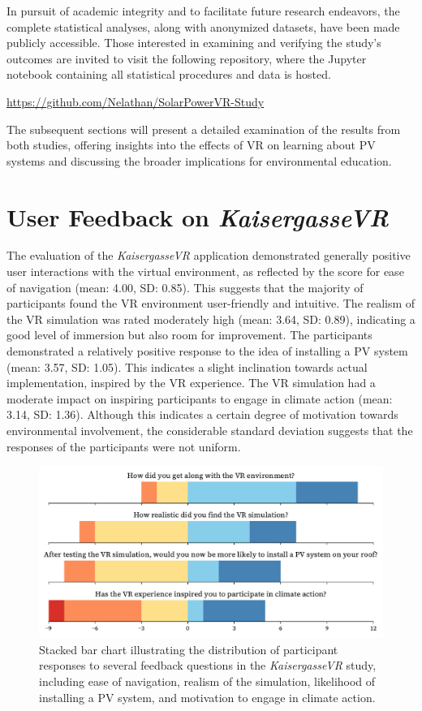 \documentclass[draft, final]{vutinfth} %
\begin{document}
In pursuit of academic integrity and to facilitate future research endeavors, the complete statistical analyses, along with anonymized datasets, have been made publicly accessible. Those interested in examining and verifying the study's outcomes are invited to visit the following repository, where the Jupyter notebook containing all statistical procedures and data is hosted.
\begin{center}
\url{https://github.com/Nelathan/SolarPowerVR-Study}
\end{center}

The subsequent sections will present a detailed examination of the results from both studies, offering insights into the effects of VR on learning about PV systems and discussing the broader implications for environmental education.

\section{User Feedback on \textit{KaisergasseVR}}
The evaluation of the \textit{KaisergasseVR} application demonstrated generally positive user interactions with the virtual environment, as reflected by the score for ease of navigation (mean: 4.00, SD: 0.85). This suggests that the majority of participants found the VR environment user-friendly and intuitive.
The realism of the VR simulation was rated moderately high (mean: 3.64, SD: 0.89), indicating a good level of immersion but also room for improvement.
The participants demonstrated a relatively positive response to the idea of installing a PV system (mean: 3.57, SD: 1.05). This indicates a slight inclination towards actual implementation, inspired by the VR experience.
The VR simulation had a moderate impact on inspiring participants to engage in climate action (mean: 3.14, SD: 1.36). Although this indicates a certain degree of motivation towards environmental involvement, the considerable standard deviation suggests that the responses of the participants were not uniform.

\begin{figure}[h]
    \centering
    \includegraphics[width=\textwidth]{graphics/feedback-kaisergasse.pdf}
    \caption{Stacked bar chart illustrating the distribution of participant responses to several feedback questions in the \textit{KaisergasseVR} study, including ease of navigation, realism of the simulation, likelihood of installing a PV system, and motivation to engage in climate action.}
    \label{fig:feedback-kaisergasse}
\end{figure}
\end{document}
